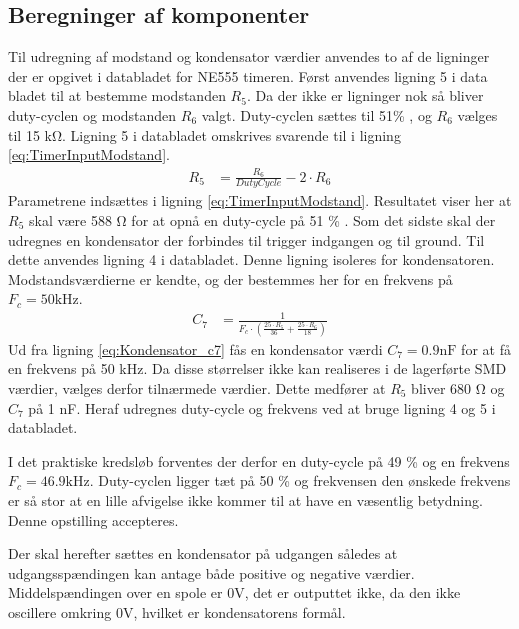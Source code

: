 \subsection{Beregninger af komponenter}
Til udregning af modstand og kondensator værdier anvendes to af de ligninger der er opgivet i databladet for NE555 timeren. 
Først anvendes ligning 5 i data bladet til at bestemme modstanden $R_5$. 
Da der ikke er ligninger nok så bliver duty-cyclen og modstanden $R_6$ valgt. 
Duty-cyclen sættes til 51\%  , og $R_6$ vælges til 15 \si{\kilo\ohm}. 
Ligning 5 i databladet omskrives svarende til i ligning \ref{eq:TimerInputModstand}.
\begin{align}
R_5 & = \frac{R_6}{DutyCycle} - 2 \cdot R_6 \label{eq:TimerInputModstand}
\end{align}
Parametrene indsættes i ligning \ref{eq:TimerInputModstand}.
Resultatet viser her at $R_5$ skal være 588 \si{\ohm}  for at opnå en duty-cycle på 51 \% .
Som det sidste skal der udregnes en kondensator der forbindes til trigger indgangen og til ground. 
Til dette anvendes ligning 4 i databladet. Denne ligning isoleres for kondensatoren.
Modstandsværdierne er kendte, og der bestemmes her for en frekvens på $F_c = 50 \si{\kilo\hertz}$.
\begin{align}
	C_7 & = \frac{1}{F_c \cdot \left( \frac{25 \cdot R_5 }{36} + \frac{25 \cdot R_6}{18} \right) \label{eq:Kondensator_c7}}
\end{align}
Ud fra ligning \ref{eq:Kondensator_c7} fås en kondensator værdi $C_7 = 0.9\si{\nano\farad}$ for at få en frekvens på 50 \si{\kilo\hertz}. 
Da disse størrelser ikke kan realiseres i de lagerførte SMD værdier, vælges derfor tilnærmede værdier. 
Dette medfører at $R_5$ bliver 680 \si{\ohm} og $C_7$ på 1 \si{\nano\farad}. 
Heraf udregnes duty-cycle og frekvens ved at bruge ligning 4 og 5 i databladet.

I det praktiske kredsløb forventes der derfor en duty-cycle på 49 \% og en frekvens $F_c = 46.9 \si{\kilo\hertz}$. 
Duty-cyclen ligger tæt på 50 \% og frekvensen den ønskede frekvens er så stor at en lille afvigelse ikke kommer til at have en væsentlig betydning. Denne opstilling accepteres.

Der skal herefter sættes en kondensator på udgangen således at udgangsspændingen kan antage både positive og negative værdier. 
Middelspændingen over en spole er $0 \si{\volt}$, det er outputtet ikke, da den ikke oscillere omkring $0 \si{\volt}$, hvilket er kondensatorens formål. 
